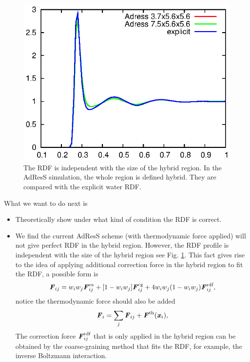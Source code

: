 \documentclass[aps,pre,preprint,unsortedaddress]{revtex4}
\newcommand{\bluec}[1]{{\color{blue} #1}}
\renewcommand{\v}[1]{\textbf{\textit{#1}}}
\begin{document}
\begin{figure}
  \centering
  \includegraphics[]{fig/old.rdf/rdfs.eps}
  \caption{The RDF is independent with the size of the hybrid region.
    In the AdResS simulation, the whole region is defined hybrid. They
    are compared with the explicit water RDF.}
  \label{fig:tmp2}
\end{figure}

\bluec{
  What we want to do next is
  \begin{itemize}
  \item Theoretically show under what kind of condition the RDF is
    correct.
  \item We find the current AdResS scheme (with thermodynamic force
    applied) will not give perfect RDF in the hybrid region. However,
    the RDF profile is independent with the size of the hybrid region
    see Fig. \ref{fig:tmp2}. This fact gives rise to the idea of
    applying additional correction force in the hybrid region to fit
    the RDF, a possible form is
    \begin{align}
      \v F_{ij} = w_iw_j\v F^{\textrm{ex}}_{ij} + [1-w_iw_j]\v F^{\textrm{cg}}_{ij} +
      4 w_iw_j (1 - w_iw_j)\v F_{ij}^{\textrm{rdf}},
    \end{align}
    notice the thermodynamic force should also be added
    \begin{align}
      \v F_i = \sum_j\v F_{ij} + \v F^{\textrm{th}}(\v x_i),
    \end{align}
    The correction force $\v F_{ij}^{\textrm{rdf}}$ that is only
    applied in the hybrid region can be obtained by the
    coarse-graining method that fits the RDF, for example, the inverse
    Boltzmann interaction. 
  \end{itemize}
}
  
\end{document}
